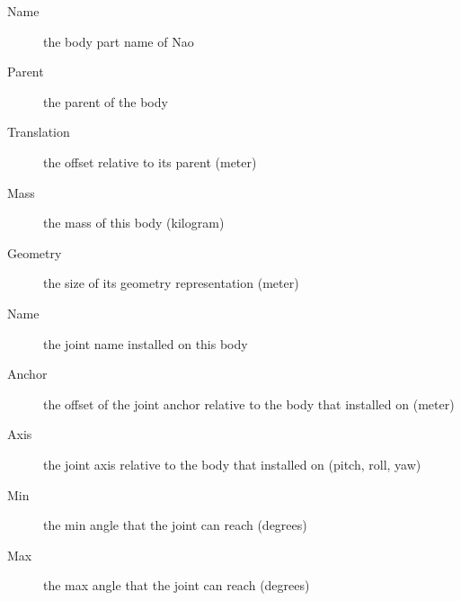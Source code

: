 \begin{description}
\item[Name] the body part name of Nao
\item[Parent]  the parent of the body
\item[Translation] the offset relative to its parent (meter)
\item[Mass] the mass of this body (kilogram)
\item[Geometry] the size of its geometry representation (meter)
\item[Name] the joint name installed on this body
\item[Anchor] the offset of the joint anchor relative to the body that
  installed on (meter)
\item[Axis] the joint axis relative to the body that installed on (pitch, roll,
yaw)
\item[Min] the min angle that the joint can reach (degrees)
\item[Max] the max angle that the joint can reach (degrees)
\end{description}



